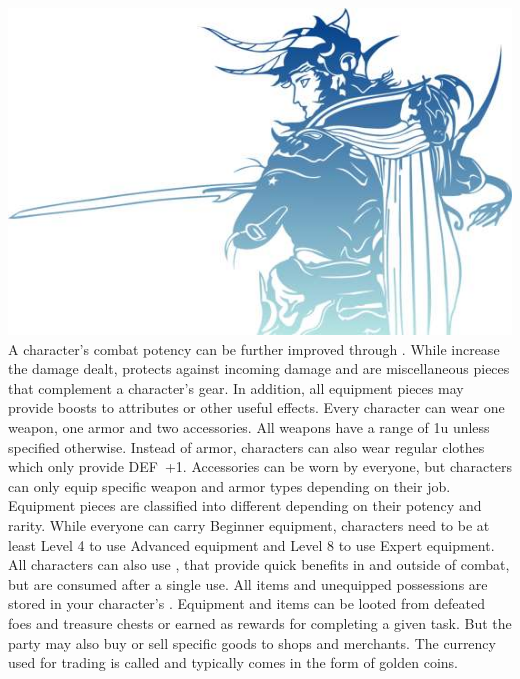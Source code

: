 %
\\
%
\includegraphics[width=\columnwidth]{./art/images/ff1.jpg}
%
\vfill
%
A character's combat potency can be further improved through . 
While  increase the damage dealt,  protects against incoming damage and  are miscellaneous pieces that complement a character's gear.
In addition, all equipment pieces may provide boosts to attributes or other useful effects. 
Every character can wear one weapon, one armor and two accessories. 
All weapons have a range of 1u unless specified otherwise. 
Instead of armor, characters can also wear regular clothes which only provide DEF~+1.
Accessories can be worn by everyone, but characters can only equip specific weapon and armor types depending on their job.
Equipment pieces are classified into different  depending on their potency and rarity.
While everyone can carry Beginner equipment, characters need to be at least Level 4 to use Advanced equipment and Level 8 to use Expert equipment. 
All characters can also use , that provide quick benefits in and outside of combat, but are consumed after a single use.
%
\vfill
%
All items and unequipped possessions are stored in your character's .
Equipment and items can be looted from defeated foes and treasure chests or earned as rewards for completing a given task. 
But the party may also buy or sell specific goods to shops and merchants. 
The currency used for trading is called  and typically comes in the form of golden coins.
